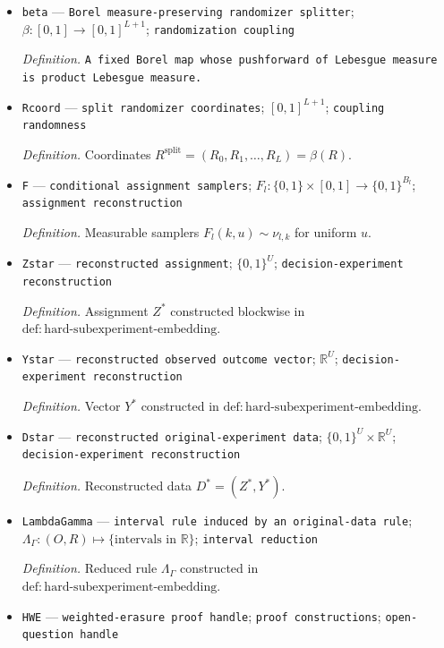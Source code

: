 \documentclass{article}
\begin{document}
\begin{itemize}
  \item \texttt{beta} --- \texttt{Borel measure-\allowbreak{}preserving randomizer splitter}; \(\beta:[0,1]\to[0,1]^{L+1}\); \texttt{randomization coupling}
  \par\smallskip\noindent\emph{Definition.} \texttt{A fixed Borel map whose pushforward of Lebesgue measure is product Lebesgue measure.}
  \item \texttt{Rcoord} --- \texttt{split randomizer coordinates}; \([0,1]^{L+1}\); \texttt{coupling randomness}
  \par\smallskip\noindent\emph{Definition.} Coordinates \(R^{\mathrm{split}}=(R_0,R_1,\ldots,R_L)=\beta(R)\).
  \item \texttt{F} --- \texttt{conditional assignment samplers}; \(F_l:\{0,1\}\times[0,1]\to\{0,1\}^{B_l}\); \texttt{assignment reconstruction}
  \par\smallskip\noindent\emph{Definition.} Measurable samplers \(F_l(k,u)\sim\nu_{l,k}\) for uniform \(u\).
  \item \texttt{Zstar} --- \texttt{reconstructed assignment}; \(\{0,1\}^U\); \texttt{decision-\allowbreak{}experiment reconstruction}
  \par\smallskip\noindent\emph{Definition.} Assignment \(Z^*\) constructed blockwise in \(\mathrm{def{:}hard\text{-}subexperiment\text{-}embedding}\).
  \item \texttt{Ystar} --- \texttt{reconstructed observed outcome vector}; \(\mathbb R^U\); \texttt{decision-\allowbreak{}experiment reconstruction}
  \par\smallskip\noindent\emph{Definition.} Vector \(Y^*\) constructed in \(\mathrm{def{:}hard\text{-}subexperiment\text{-}embedding}\).
  \item \texttt{Dstar} --- \texttt{reconstructed original-\allowbreak{}experiment data}; \(\{0,1\}^U\times\mathbb R^U\); \texttt{decision-\allowbreak{}experiment reconstruction}
  \par\smallskip\noindent\emph{Definition.} Reconstructed data \(D^*=(Z^*,Y^*)\).
  \item \texttt{LambdaGamma} --- \texttt{interval rule induced by an original-\allowbreak{}data rule}; \(\Lambda_\Gamma:(O,R)\mapsto\{\text{intervals in }\mathbb R\}\); \texttt{interval reduction}
  \par\smallskip\noindent\emph{Definition.} Reduced rule \(\Lambda_\Gamma\) constructed in \(\mathrm{def{:}hard\text{-}subexperiment\text{-}embedding}\).
  \item \texttt{HWE} --- \texttt{weighted-\allowbreak{}erasure proof handle}; \texttt{proof constructions}; \texttt{open-\allowbreak{}question handle}

\end{itemize}
\end{document}
